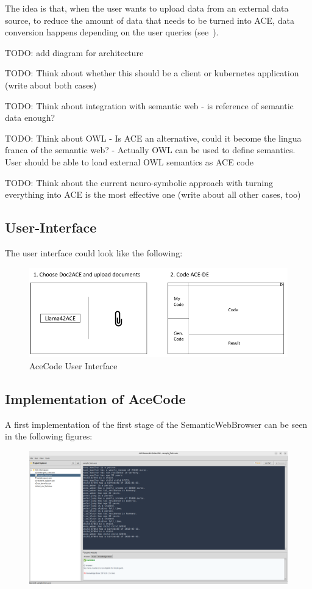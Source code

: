 \documentclass[12pt,a4paper]{article}
\begin{document}
The idea is that, when the user wants to upload data from an external data source, to reduce the amount of data that needs to be turned into ACE, data conversion happens depending on the user queries (see~\cite{schemaInference}).

TODO: add diagram for architecture

TODO: Think about whether this should be a client or kubernetes application (write about both cases)

TODO: Think about integration with semantic web - is reference of semantic data enough?

TODO: Think about OWL - Is ACE an alternative, could it become the lingua franca of the semantic web? - Actually OWL can be used to define semantics. User should be able to load external OWL semantics as ACE code

TODO: Think about the current neuro-symbolic approach with turning everything into ACE is the most effective one (write about all other cases, too)

\subsection{User-Interface}

The user interface could look like the following:

\begin{figure}[h]
\includegraphics[width=16cm]{ui_mock}
\caption{AceCode User Interface}
\end{figure}

\subsection{Implementation of AceCode}

A first implementation of the first stage of the SemanticWebBrowser can be seen in the following figures:

\begin{figure}[h]
    \includegraphics[width=16cm]{ace_code_screenshot_1}
\end{figure}
\end{document}
